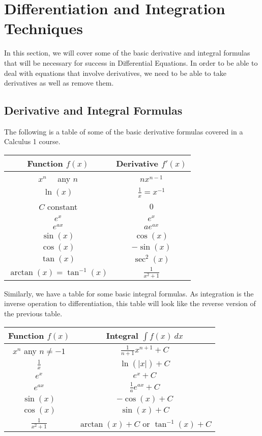 \section{Differentiation and Integration Techniques}
\label{sec:derivInt}

In this section, we will cover some of the basic derivative and integral formulas that will be necessary for success in Differential Equations. In order to be able to deal with equations that involve derivatives, we need to be able to take derivatives as well as remove them.

\subsection{Derivative and Integral Formulas}

The following is a table of some of the basic derivative formulas covered in a Calculus 1 course.

\begin{center}
\begin{tabular}{|c|c|}\hline
\textbf{Function $f(x)$} & \textbf{Derivative $f'(x)$} \\ \hline
$x^n$ \ \ any $n$ & $nx^{n-1}$ \\ \hline
$\ln(x)$ & $\frac{1}{x} = x^{-1}$ \\ \hline
$C$ constant & $0$ \\ \hline
$e^x$ & $e^x$ \\ \hline
$e^{ax}$ & $ae^{ax}$ \\ \hline
$\sin(x)$ & $\cos(x)$ \\ \hline
$\cos(x)$ & $-\sin(x)$ \\ \hline
$\tan(x)$ & $\sec^2(x)$ \\ \hline
$\arctan(x) = \tan^{-1}(x)$ & $\frac{1}{x^2 + 1}$ \\ \hline
\end{tabular}
\end{center}

Similarly, we have a table for some basic integral formulas. As integration is the inverse operation to differentiation, this table will look like the reverse version of the previous table.

\begin{center}
\begin{tabular}{|c|c|} \hline
\textbf{Function $f(x)$} & \textbf{Integral $\int f(x)\ dx$} \\ \hline
$x^n$ any $n \neq -1$ & $\frac{1}{n+1}x^{n+1} + C$ \\ \hline
$\frac{1}{x}$ & $\ln(|x|) + C$ \\ \hline
$e^x$ & $e^x + C$ \\ \hline
$e^{ax}$ & $\frac{1}{a}e^{ax} + C$ \\ \hline
$\sin(x)$ & $-\cos(x) + C$ \\ \hline
$\cos(x)$ & $\sin(x) + C$ \\ \hline
$\frac{1}{x^2 + 1}$ & $\arctan(x) + C$ or $\tan^{-1}(x) + C$ \\ \hline
\end{tabular}
\end{center}

